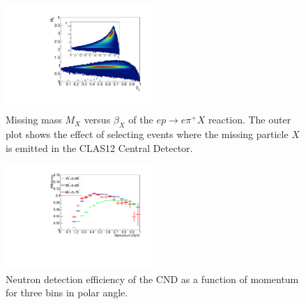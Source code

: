 \begin{figure}[htb]  
\begin{center}
\includegraphics[width=0.5\textwidth]{Figure/SelectionPlots.pdf}
\caption {Missing mass $M_X$ versus $\beta_X$ of the $e p \rightarrow e\pi^+X$ reaction. The outer plot shows the effect of selecting events where the missing particle $X$ is emitted in the CLAS12 Central Detector.}
\label{fig_performance_selection}
\end{center}
\end{figure}

\begin{figure}[htb]  
\begin{center}
\includegraphics[width=0.5\textwidth]{Figure/effFinale.pdf}
\caption {Neutron detection efficiency of the CND as a function of momentum for three bins in polar angle.}
\label{fig_performance_efficiency}
\end{center}
\end{figure}

